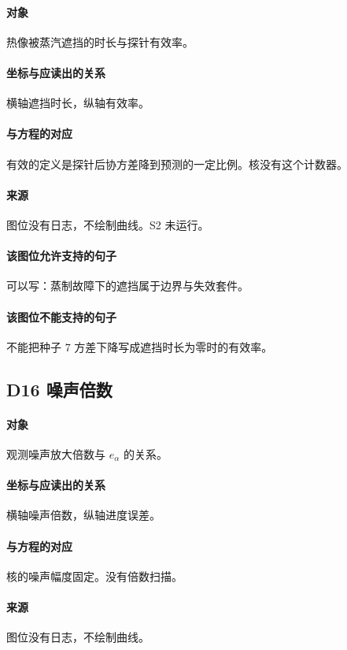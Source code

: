 \paragraph{对象}
热像被蒸汽遮挡的时长与探针有效率。

\paragraph{坐标与应读出的关系}
横轴遮挡时长，纵轴有效率。

\paragraph{与方程的对应}
有效的定义是探针后协方差降到预测的一定比例。核没有这个计数器。

\paragraph{来源}
图位没有日志，不绘制曲线。S2 未运行。

\paragraph{该图位允许支持的句子}
可以写：蒸制故障下的遮挡属于边界与失效套件。

\paragraph{该图位不能支持的句子}
不能把种子 7 方差下降写成遮挡时长为零时的有效率。

\subsection{D16 噪声倍数}
\paragraph{对象}
观测噪声放大倍数与 $e_\alpha$ 的关系。

\paragraph{坐标与应读出的关系}
横轴噪声倍数，纵轴进度误差。

\paragraph{与方程的对应}
核的噪声幅度固定。没有倍数扫描。

\paragraph{来源}
图位没有日志，不绘制曲线。

